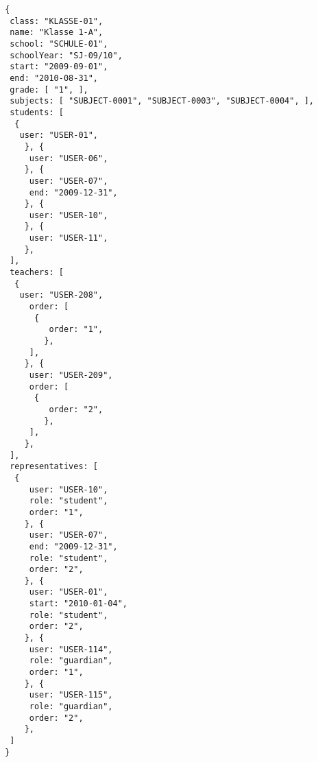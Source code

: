 
\begin{lstlisting}[caption={Klassen-Datenmodell
 Beispiel 2: Grundschulklasse},frame=tlrb]
{
 class: "KLASSE-01",
 name: "Klasse 1-A",
 school: "SCHULE-01",
 schoolYear: "SJ-09/10",
 start: "2009-09-01",
 end: "2010-08-31",
 grade: [ "1", ],
 subjects: [ "SUBJECT-0001", "SUBJECT-0003", "SUBJECT-0004", ],
 students: [
  { 
   user: "USER-01",
	}, { 
	 user: "USER-06",
	}, { 
	 user: "USER-07",
	 end: "2009-12-31",
	}, { 
	 user: "USER-10",
	}, { 
	 user: "USER-11",
	},
 ],
 teachers: [
  { 
   user: "USER-208",
	 order: [
	  {
		 order: "1",
		},
	 ],
	}, { 
	 user: "USER-209",
	 order: [
	  {
		 order: "2",
		},
	 ],
	},
 ],
 representatives: [
  {
	 user: "USER-10",
	 role: "student",
	 order: "1",	 
	}, {
	 user: "USER-07",
	 end: "2009-12-31",
	 role: "student",
	 order: "2",	 
	}, {
	 user: "USER-01",
	 start: "2010-01-04",
	 role: "student",
	 order: "2",	 
	}, {
	 user: "USER-114",
	 role: "guardian",
	 order: "1",	 
	}, {
	 user: "USER-115",
	 role: "guardian",
	 order: "2",	 
	},  
 ]
}
\end{lstlisting}

